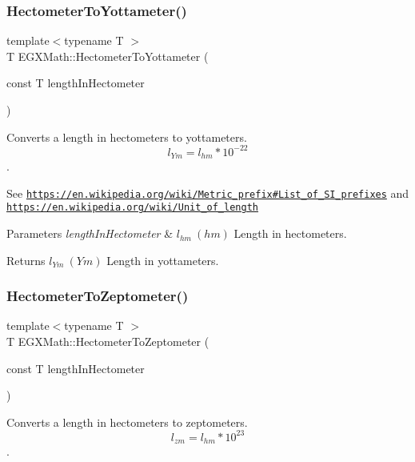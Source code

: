 \subsubsection{\texorpdfstring{Hectometer\+To\+Yottameter()}{HectometerToYottameter()}}
{\footnotesize\ttfamily template$<$typename T $>$ \\
T E\+G\+X\+Math\+::\+Hectometer\+To\+Yottameter (\begin{DoxyParamCaption}\item[{const T}]{length\+In\+Hectometer }\end{DoxyParamCaption})}



Converts a length in hectometers to yottameters. \[ l_{Ym}=l_{hm} * 10^{-22} \]. 

See \href{https://en.wikipedia.org/wiki/Metric_prefix#List_of_SI_prefixes}{\tt https\+://en.\+wikipedia.\+org/wiki/\+Metric\+\_\+prefix\#\+List\+\_\+of\+\_\+\+S\+I\+\_\+prefixes} and \href{https://en.wikipedia.org/wiki/Unit_of_length}{\tt https\+://en.\+wikipedia.\+org/wiki/\+Unit\+\_\+of\+\_\+length} 
\begin{DoxyParams}{Parameters}
{\em length\+In\+Hectometer} & $ l_{hm}\ (hm)$ Length in hectometers. \\
\hline
\end{DoxyParams}
\begin{DoxyReturn}{Returns}
$ l_{Ym}\ (Ym)$ Length in yottameters. 
\end{DoxyReturn}
\mbox{\label{group___e_g_x_math-_conversions-_length_conversions-_hectometer-_s_i_ga8ad2a40e4868b0a8de07e0e6f416f025}} 
\subsubsection{\texorpdfstring{Hectometer\+To\+Zeptometer()}{HectometerToZeptometer()}}
{\footnotesize\ttfamily template$<$typename T $>$ \\
T E\+G\+X\+Math\+::\+Hectometer\+To\+Zeptometer (\begin{DoxyParamCaption}\item[{const T}]{length\+In\+Hectometer }\end{DoxyParamCaption})}



Converts a length in hectometers to zeptometers. \[ l_{zm}=l_{hm} * 10^{23} \]. 

